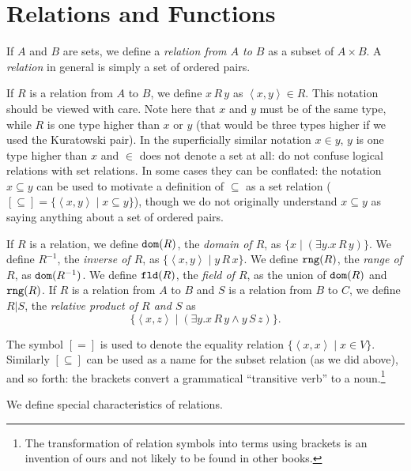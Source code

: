 \documentclass[12pt]{book}
\begin{document}
\section{Relations and Functions}

If $A$ and $B$ are sets, we define a {\em relation from $A$ to $B$\/}
as a subset of $A \times B$.  A {\em relation\/} in general is simply
a set of ordered pairs.

If $R$ is a relation from $A$ to $B$, we define $x \,R\,y$ as
$\left<x,y\right>\in R$.  This notation should be viewed with care.
Note here that $x$ and $y$ must be of the same type, while $R$ is one
type higher than $x$ or $y$ (that would be three types higher if we
used the Kuratowski pair).  In the superficially similar notation $x
\in y$, $y$ is one type higher than $x$ and $\in$ does not denote a
set at all: do not confuse logical relations with set relations.  In
some cases they can be conflated: the notation $x \subseteq y$ can be
used to motivate a definition of $\subseteq$ as a set relation
($[\subseteq]=\{\left<x,y\right>\mid x \subseteq y\}$), though we do
not originally understand $x \subseteq y$ as saying anything about a
set of ordered pairs.

If $R$ is a relation, we define ${\tt dom}(R)$, the {\em domain of
$R$\/}, as $\{x \mid (\exists y.x\,R\,y)\}$.  We define $R^{-1}$, the
{\em inverse of $R$\/}, as $\{\left<x,y\right>\mid y\,R\,x\}$.  We
define ${\tt rng}(R)$, the {\em range of $R$\/}, as ${\tt
dom}(R^{-1})$.  We define ${\tt fld}(R)$, the {\em field of $R$\/}, as
the union of ${\tt dom}(R)$ and ${\tt rng}(R)$.  If $R$ is a relation
from $A$ to $B$ and $S$ is a relation from $B$ to $C$, we define
$R|S$, the {\em relative product of $R$ and $S$\/} as
$$\{\left<x,z\right>\mid(\exists y.x\,R\,y \wedge y\,S\,z)\}.$$

The symbol $[=]$ is used to denote the equality relation
$\{\left<x,x\right>\mid x \in V\}$.  Similarly $[\subseteq]$ can be
used as a name for the subset relation (as we did above), and so
forth: the brackets convert a grammatical ``transitive verb'' to a
noun.\footnote{The transformation of relation symbols into terms using brackets is an invention of ours and not likely to be found in other books.}

We define special characteristics of relations.
\end{document}
